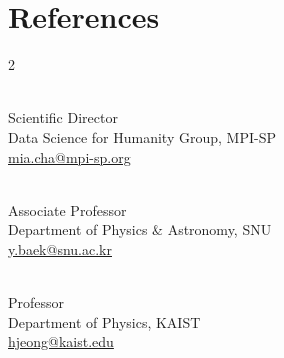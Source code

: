 \documentclass[11pt,letterpaper]{article}
\begin{document}
\section{References}
\begin{multicols}{2}
\begin{description}[leftmargin=0pt,topsep=0pt,itemsep=5pt,parsep=0pt]
    \item[\href{https://www.mpi-sp.org/cha}{Meeyoung Cha}] \hfill \\
    Scientific Director \\
    Data Science for Humanity Group, MPI-SP \\
    \href{mailto:mia.cha@mpi-sp.org}{\faEnvelope \space mia.cha@mpi-sp.org}

    \item[\href{https://yongjoobaek.wordpress.com}{Yongjoo Baek}] \hfill \\
    Associate Professor \\
    Department of Physics \& Astronomy, SNU \\
    \href{mailto:y.baek@snu.ac.kr}{\faEnvelope \space y.baek@snu.ac.kr}

\end{description}
\columnbreak
\begin{description}[leftmargin=0pt,topsep=0pt,itemsep=5pt,parsep=0pt]
    \item[\href{https://stat.kaist.ac.kr:2583/~hjeong/}{Hawoong Jeong}] \hfill \\
    Professor \\
    Department of Physics, KAIST \\
    \href{mailto:hjeong@kaist.edu}{\faEnvelope \space hjeong@kaist.edu}

\end{description}
\end{multicols}
\end{document}
